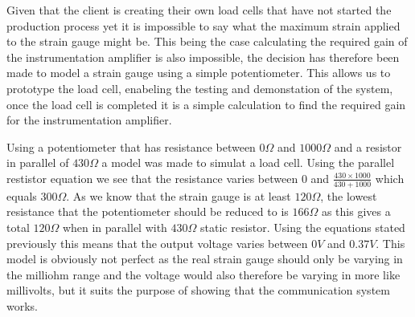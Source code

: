Given that the client is creating their own load cells that have not started the production process yet it is impossible to say what the maximum strain applied to the strain gauge might be. This being the case calculating the required gain of the instrumentation amplifier is also impossible, the decision has therefore been made to model a strain gauge using a simple potentiometer. This allows us to prototype the load cell, enabeling the testing and demonstation of the system, once the load cell is completed it is a simple calculation to find the required gain for the instrumentation amplifier. 

Using a potentiometer that has resistance between $0\Omega$ and $1000\Omega$ and a resistor in parallel of $430\Omega$ a model was made to simulat a load cell. Using the parallel restistor equation we see that the resistance varies between $0$ and $\frac{430 \times 1000}{430 + 1000}$  which equals $300\Omega$. As we know that the strain gauge is at least $120\Omega$, the lowest resistance that the potentiometer should be reduced to is $166\Omega$ as this gives a total $120\Omega$ when in parallel with $430\Omega$ static resistor. Using the equations stated previously this means that the output voltage varies between $0V$ and $0.37V$. This model is obviously not perfect as the real strain gauge should only be varying in the milliohm range and the voltage would also therefore be varying in more like millivolts, but it suits the purpose of showing that the communication system works. 